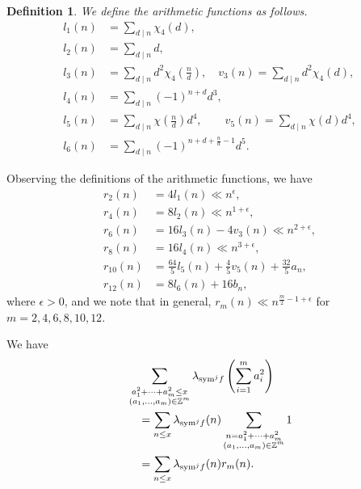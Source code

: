 \documentclass[10pt]{amsart}
\newtheorem{defn}[theorem]{Definition}
\begin{document}
\begin{defn} We define the arithmetic functions as follows.
    \begin{align} 
        l_1(n) &= \sum_{d \mid n}\chi_4(d), \label{eq:l_1(n)} \\
        l_2(n) &= \sum_{d \mid n}d, \label{eq:l_2(n)} \\
        l_3(n) &= \sum_{d \mid n}d^2\chi_4\left( \frac{n}{d} \right), \quad v_3(n) = \sum_{d \mid n} d^2 \chi_4(d), \label{eq:l_3(n)&v_3(n)} \\
        l_4(n) &= \sum_{d \mid n}(-1)^{n+d}d^3, \label{eq:l_4(n)} \\
        l_5(n) &= \sum_{d \mid n} \chi\!\left(\frac{n}{d}\right) d^4, \qquad v_5(n) = \sum_{d \mid n} \chi(d)d^4, \label{eq:l_5(n)&v_5(n)} \\
        l_6(n) &= \sum_{d \mid n}(-1)^{n+d+\frac{n}{d}-1}d^5. \label{eq:l_6(n)}
    \end{align}
\end{defn}

Observing the definitions of the arithmetic functions, we have
\begin{align} 
    r_2(n) &= 4l_1(n) \ll n^\epsilon, \label{eq:r_2&l_1} \\
    r_4(n) &= 8l_2(n) \ll n^{1+\epsilon}, \label{eq:r_4&l_2} \\
    r_6(n) &= 16l_3(n) - 4v_3(n) \ll n^{2+\epsilon}, \label{eq:r_6&l_3&v_3} \\
    r_8(n) &= 16l_4(n) \ll n^{3+\epsilon}, \label{eq:r_8&l_4} \\
    r_{10}(n) &= \frac{64}{5}l_5(n) + \frac{4}{5}v_5(n) + \frac{32}{5}a_n, \label{eq:r_10&l_5&v_5} \\
    r_{12}(n) &= 8l_6(n) + 16b_n, \label{eq:r_12&l_6}
\end{align}
where $\epsilon > 0$, and we note that in general, $r_{m}(n) \ll n^{\frac{m}{2}-1+\epsilon}$ for $m=2, 4, 6, 8, 10, 12$.

We have 
\begin{align}
    &\sum_{\substack{a_{1}^{2}+\cdots+a_{m}^{2}\leq x \\ (a_{1},\ldots,a_{m})\in\mathbb{Z}^{m}}}\lambda_{\mathrm{sym}^{j}f}\left(\sum_{i=1}^{m}a_{i}^{2}\right) \notag \\
    &\quad = \sum_{n\leq x}\lambda_{\mathrm{sym}^{j}f}(n)\sum_{\substack{n=a_{1}^{2}+\cdots+a_{m}^{2} \\ (a_{1},\ldots,a_{m})\in\mathbb{Z}^{m}}} 1 \\
    &\quad = \sum_{n\leq x}\lambda_{\mathrm{sym}^{j}f}(n)r_{m}(n). \notag
\end{align}
\end{document}
